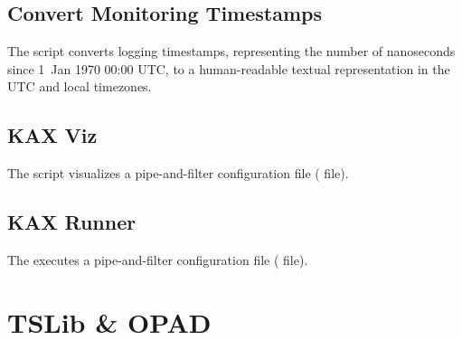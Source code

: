 		\subsection{Convert Monitoring Timestamps}
		
			The script  converts \KiekerMonitoringPart{} logging timestamps, representing the number of nanoseconds since 1~Jan 1970 00:00 UTC, to a human-readable textual representation in the UTC and local timezones.\\
		
		\subsection{KAX Viz}
		
			The  script visualizes a \KiekerAnalysisPart{} pipe-and-filter configuration file ( file).
		
		\subsection{KAX Runner}
		
		The  executes a \KiekerAnalysisPart{} pipe-and-filter configuration file ( file).
			
	\section{TSLib \& OPAD}
	